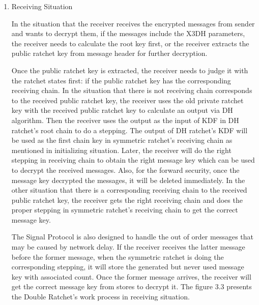 \begin{enumerate}[label=(\roman*)]
\item Receiving Situation

In the situation that the receiver receives the encrypted messages from sender and wants to decrypt them, if the messages include the X3DH parameters, the receiver needs to calculate the root key first, or the receiver extracts the public ratchet key from message header for further decryption.

Once the public ratchet key is extracted, the receiver needs to judge it with the ratchet states first: if the public ratchet key has the corresponding receiving chain. In the situation that there is not receiving chain corresponds to the received public ratchet key, the receiver uses the old private ratchet key with the received public ratchet key to calculate an output via DH algorithm. Then the receiver uses the output as the input of KDF in DH ratchet's root chain to do a stepping. The output of DH ratchet's KDF will be used as the first chain key in symmetric ratchet's receiving chain as mentioned in initializing situation. Later, the receiver will do the right stepping in receiving chain to obtain the right message key which can be used to decrypt the received messages. Also, for the forward security, once the message key decrypted the messages, it will be deleted immediately. In the other situation that there is a corresponding receiving chain to the received public ratchet key, the receiver gets the right receiving chain and does the proper stepping in symmetric ratchet's receiving chain to get the correct message key.

The Signal Protocol is also designed to handle the out of order messages that may be caused by network delay. If the receiver receives the latter message before the former message, when the symmetric ratchet is doing the corresponding stepping, it will store the generated but never used message key with associated count. Once the former message arrives, the receiver will get the correct message key from stores to decrypt it. The figure 3.3 presents the Double Ratchet's work process in receiving situation.


\end{enumerate}

